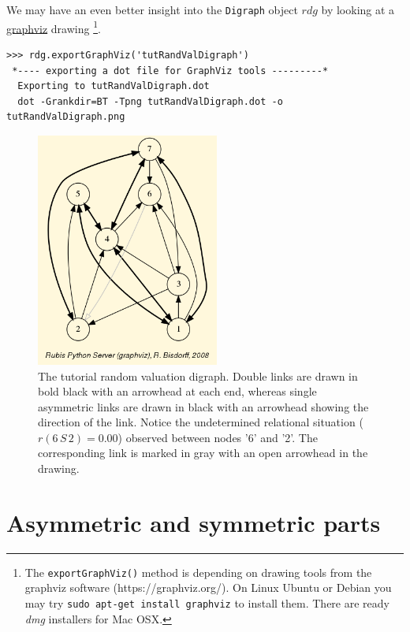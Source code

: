 We may have an even better insight into the \texttt{Digraph} object $rdg$ by looking at a \href{https://graphviz.org/}{graphviz} drawing \footnote{The \texttt{exportGraphViz()} method is depending on drawing tools from the graphviz software (https://graphviz.org/). On Linux Ubuntu or Debian you may try \texttt{sudo apt-get install graphviz} to install them. There are ready \emph{dmg} installers for Mac OSX.}.
\begin{lstlisting}
>>> rdg.exportGraphViz('tutRandValDigraph')
 *---- exporting a dot file for GraphViz tools ---------*
  Exporting to tutRandValDigraph.dot
  dot -Grankdir=BT -Tpng tutRandValDigraph.dot -o tutRandValDigraph.png
\end{lstlisting}
\begin{figure}[h]
\sidecaption
\includegraphics[width=6cm]{Figures/tutRandValDigraph.png}
\caption{The tutorial random valuation digraph. Double links are drawn in bold black with an arrowhead at each end, whereas single asymmetric links are drawn in black with an arrowhead showing the direction of the link. Notice the undetermined relational situation ($r(6\,S\,2) = 0.00$) observed between nodes '6' and '2'. The corresponding link is marked in gray with an open arrowhead in the drawing.}
\label{fig:2.1}       %
\end{figure}
  
\section{Asymmetric and symmetric parts}
\label{sec:2.3}

